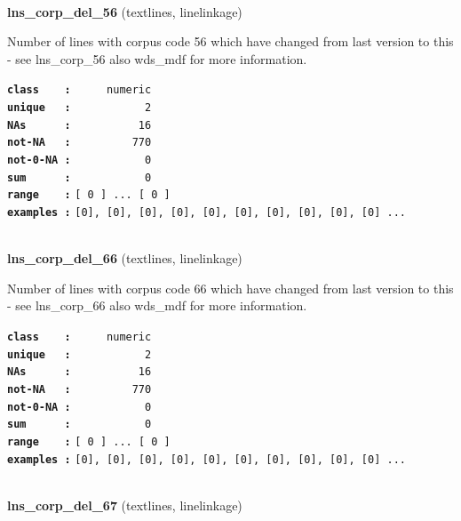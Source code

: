 \documentclass[]{article}
\begin{document}
~

\textbf{lns\_corp\_del\_56} (textlines, linelinkage)

Number of lines with corpus code 56 which have changed from last version
to this - see lns\_corp\_56 also wds\_mdf for more information.

\textbf{\texttt{class\ \ \ \ :}} \texttt{~~~~~numeric}\\
\textbf{\texttt{unique\ \ \ :}} \texttt{~~~~~~~~~~~2}\\
\textbf{\texttt{NAs\ \ \ \ \ \ :}} \texttt{~~~~~~~~~~16}\\
\textbf{\texttt{not-NA\ \ \ :}} \texttt{~~~~~~~~~770}\\
\textbf{\texttt{not-0-NA\ :}} \texttt{~~~~~~~~~~~0}\\
\textbf{\texttt{sum\ \ \ \ \ \ :}} \texttt{~~~~~~~~~~~0}\\
\textbf{\texttt{range\ \ \ \ :}}
\texttt{{[}\ 0\ {]}\ ...\ {[}\ 0\ {]}}\\
\textbf{\texttt{examples\ :}}
\texttt{{[}0{]},\ {[}0{]},\ {[}0{]},\ {[}0{]},\ {[}0{]},\ {[}0{]},\ {[}0{]},\ {[}0{]},\ {[}0{]},\ {[}0{]}\ ...}\\

~

\textbf{lns\_corp\_del\_66} (textlines, linelinkage)

Number of lines with corpus code 66 which have changed from last version
to this - see lns\_corp\_66 also wds\_mdf for more information.

\textbf{\texttt{class\ \ \ \ :}} \texttt{~~~~~numeric}\\
\textbf{\texttt{unique\ \ \ :}} \texttt{~~~~~~~~~~~2}\\
\textbf{\texttt{NAs\ \ \ \ \ \ :}} \texttt{~~~~~~~~~~16}\\
\textbf{\texttt{not-NA\ \ \ :}} \texttt{~~~~~~~~~770}\\
\textbf{\texttt{not-0-NA\ :}} \texttt{~~~~~~~~~~~0}\\
\textbf{\texttt{sum\ \ \ \ \ \ :}} \texttt{~~~~~~~~~~~0}\\
\textbf{\texttt{range\ \ \ \ :}}
\texttt{{[}\ 0\ {]}\ ...\ {[}\ 0\ {]}}\\
\textbf{\texttt{examples\ :}}
\texttt{{[}0{]},\ {[}0{]},\ {[}0{]},\ {[}0{]},\ {[}0{]},\ {[}0{]},\ {[}0{]},\ {[}0{]},\ {[}0{]},\ {[}0{]}\ ...}\\

~

\textbf{lns\_corp\_del\_67} (textlines, linelinkage)
\end{document}

